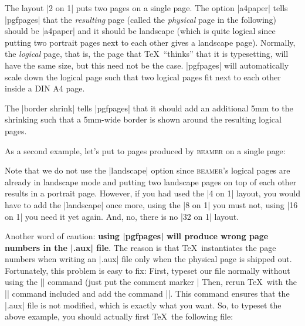 The layout |2 on 1| puts two pages on a single page. The option
|a4paper| tells |pgfpages| that the \emph{resulting} page (called the
\emph{physical} page in the following) should be |a4paper| and it
should be landscape (which is quite logical since putting two portrait
pages next to each other gives a landscape page). Normally, the
\emph{logical} page, that is, the page that \TeX\ ``thinks'' that it
is typesetting, will have the same size, but this need not be the
case. |pgfpages| will automatically scale down the logical page such
that two logical pages fit next to each other inside a DIN A4 page.

The |border shrink| tells |pgfpages| that it should add an additional
5mm to the shrinking such that a 5mm-wide border is shown around the
resulting logical pages.

As a second example, let's put to pages produced by \textsc{beamer} on
a single page:


Note that we do not use the |landscape| option since \textsc{beamer}'s
logical pages are already in landscape mode and putting two landscape
pages on top of each other results in a portrait page. However, if you
had used the |4 on 1| layout, you would have to add the |landscape|
once more, using the |8 on 1| you must not, using |16 on 1| you need
it yet again. And, no, there is no |32 on 1| layout.

Another word of caution: \textbf{using |pgfpages| will produce wrong
  page numbers in the |.aux| file}. The reason is that \TeX\
instantiates the page numbers when writing an |.aux| file only when
the physical page is shipped out. Fortunately, this problem is easy to
fix: First, typeset our file normally without using the
|\pgfpagelayout| command (just put the comment marker |%
Then, rerun \TeX\ with the |\pgfpagelayout| command included and add
the command |\nofiles|. This command ensures that the |.aux| file is
not modified, which is exactly what you want. So, to typeset the above
example, you should actually first \TeX\ the following file:

